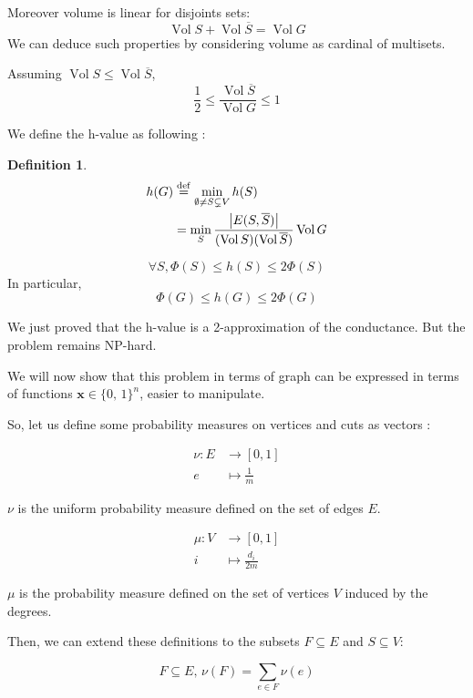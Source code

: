 \documentclass[12pt]{article}
\newtheorem{definition}[lemma]{Definition}
\newcommand{\defeq}{\stackrel{{\rm def}}{=}}
\newcommand{\card}[1]{\left\lvert#1\right\rvert}
\newcommand{\NP}{\textsc{NP}}
\DeclareMathOperator{\vol}{Vol}
\begin{document}
Moreover volume is linear for disjoints sets:
\[
    \vol S + \vol \overline{S} = \vol G
\]
We can deduce such properties by considering volume as cardinal of multisets.

Assuming $\vol S \leqslant \vol \overline{S}$,
\[
    \frac{1}{2} \leqslant \frac{\vol \overline{S}}{\vol G} \leqslant 1
\]

We define the h-value as following :

\begin{definition}
    \[
        \begin{aligned}
            h(G) &\defeq \min\limits_{\emptyset \neq S \subsetneq V} h(S)\\
            &=\min\limits_S \frac{\card{E(S,\overline{S})}}{(\vol S)(\vol \overline{S})} \vol G
        \end{aligned}
    \]
\end{definition}

\[
    \forall S, \Phi(S) \leqslant h(S) \leqslant 2 \Phi(S)
\]
In particular,
\[
    \Phi(G) \leqslant h(G) \leqslant 2 \Phi(G)
\]

We just proved that the h-value is a 2-approximation of the conductance. But the problem remains \NP-hard.

\bigskip

We will now show that this problem in terms of graph can be expressed in terms of functions $\textbf{x} \in \{0,\,1\}^{n}$, easier to manipulate.

So, let us define some probability measures on vertices and cuts as vectors :

\[
    \begin{aligned}
        \nu : E &\to [0,1] \\
           e &\mapsto \frac{1}{m}
    \end{aligned}
\]

$\nu$ is the uniform probability measure defined on the set of edges $E$.

\[
    \begin{aligned}
        \mu : V&\to [0,1]\\
        i &\mapsto \frac{d_i}{2m}
    \end{aligned}
\]

$\mu$ is the probability measure defined on the set of vertices $V$ induced by the degrees.

Then, we can extend these definitions to the subsets $F \subseteq E$ and $S \subseteq V$:

\[
    F\subseteq E,\, \nu(F) = \sum\limits_{e\in F} \nu(e)
\]
\end{document}
